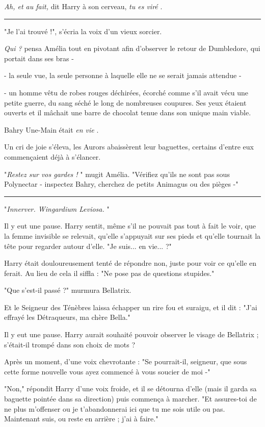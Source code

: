 \emph{Ah, et au fait,}  dit Harry à son cerveau, \emph{tu es viré} .
\par\noindent\rule{\textwidth}{0.4pt}
"Je l'ai trouvé !", s'écria la voix d'un vieux sorcier.

\emph{Qui ?}  pensa Amélia tout en pivotant afin d'observer le retour de Dumbledore, qui portait dans ses bras -

- la seule vue, la seule personne à laquelle elle ne se serait jamais attendue -

- un homme vêtu de robes rouges déchirées, écorché comme s'il avait vécu une petite guerre, du sang séché le long de nombreuses coupures. Ses yeux étaient ouverts et il mâchait une barre de chocolat tenue dans son unique main viable.

Bahry Une-Main était \emph{en vie} .

Un cri de joie s'éleva, les Aurors abaissèrent leur baguettes, certains d'entre eux commençaient déjà à s'élancer.

"\emph{Restez sur vos gardes !} " mugit Amélia. "Vérifiez qu'ils ne sont pas sous Polynectar - inspectez Bahry, cherchez de petits Animagus ou des pièges -"
\par\noindent\rule{\textwidth}{0.4pt}
"\emph{Innerver. Wingardium Leviosa.} "

Il y eut une pause. Harry sentit, même s'il ne pouvait pas tout à fait le voir, que la femme invisible se relevait, qu'elle s'appuyait sur ses pieds et qu'elle tournait la tête pour regarder autour d'elle. "Je suis... en vie... ?"

Harry était douloureusement tenté de répondre non, juste pour voir ce qu'elle en ferait. Au lieu de cela il siffla : "Ne pose pas de questions stupides."

"Que s'est-il passé ?" murmura Bellatrix.

Et le Seigneur des Ténèbres laissa échapper un rire fou et suraigu, et il dit : "J'ai effrayé les Détraqueurs, ma chère Bella."

Il y eut une pause. Harry aurait souhaité pouvoir observer le visage de Bellatrix ; s'était-il trompé dans son choix de mots ?

Après un moment, d'une voix chevrotante : "Se pourrait-il, seigneur, que sous cette forme nouvelle vous ayez commencé à vous soucier de moi -"

"Non," répondit Harry d'une voix froide, et il se détourna d'elle (mais il garda sa baguette pointée dans sa direction) puis commença à marcher. "Et assures-toi de ne plus m'offenser ou je t'abandonnerai ici que tu me sois utile ou pas. Maintenant suis, ou reste en arrière ; j'ai à faire."

